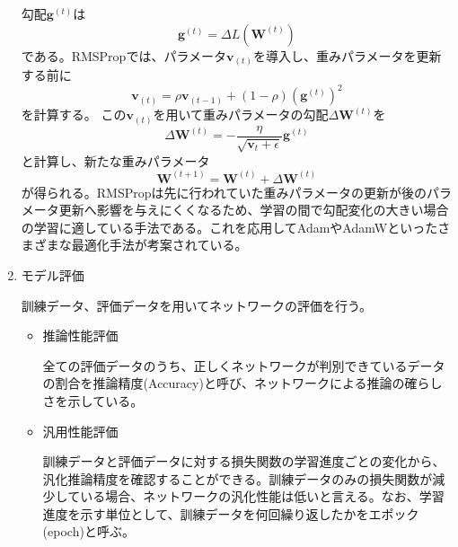 \begin{enumerate}
勾配$\textbf{g}^{(t)}$は
\[
\textbf{g}^{(t)} = \Delta L(\textbf{W}^{(t)})
\]
である。RMSPropでは、パラメータ$\textbf{v}_{(t)}$を導入し、重みパラメータを更新する前に
\[
\textbf{v}_{(t)}=\rho\textbf{v}_{(t-1)}+(1-\rho)(\textbf{g}^{(t)})^2
\]
を計算する。
この$\textbf{v}_{(t)}$を用いて重みパラメータの勾配$\Delta\textbf{W}^{(t)}$を
\[
\Delta\textbf{W}^{(t)}=-\frac{\eta}{\sqrt{\textbf{v}_t+\epsilon}}\textbf{g}^{(t)}
\]
と計算し、新たな重みパラメータ
\[
\textbf{W}^{(t+1)} = \textbf{W}^{(t)}+\Delta\textbf{W}^{(t)}
\]
が得られる。RMSPropは先に行われていた重みパラメータの更新が後のパラメータ更新へ影響を与えにくくなるため、学習の間で勾配変化の大きい場合の学習に適している手法である。これを応用してAdamやAdamWといったさまざまな最適化手法が考案されている。

\item モデル評価

訓練データ、評価データを用いてネットワークの評価を行う。
\begin{itemize}
\item 推論性能評価

全ての評価データのうち、正しくネットワークが判別できているデータの割合を推論精度(Accuracy)と呼び、ネットワークによる推論の確らしさを示している。
\item  汎用性能評価

訓練データと評価データに対する損失関数の学習進度ごとの変化から、汎化推論精度を確認することができる。訓練データのみの損失関数が減少している場合、ネットワークの汎化性能は低いと言える。なお、学習進度を示す単位として、訓練データを何回繰り返したかをエポック(epoch)と呼ぶ。

\end{itemize}

\end{enumerate}










